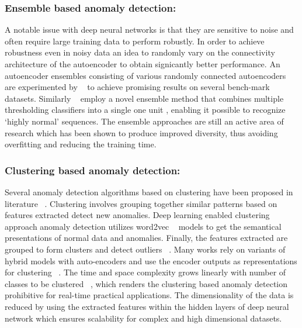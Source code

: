\subsubsection{Ensemble based anomaly detection:}
 A notable issue with deep neural networks is that they are sensitive to noise and often
require large training data to perform robustly. In order to achieve robustness even in noisy data an idea to randomly vary on the connectivity architecture of the autoencoder to obtain
signicantly better performance. An autoencoder ensembles consisting of  various randomly connected autoencoders are experimented by  ~\cite{chen2017outlier} to achieve promising results on several bench-mark datasets. Similarly ~\cite{kim2016lstm} employ a novel ensemble method that combines  multiple thresholding classifiers into a single one unit , enabling it possible to recognize ‘highly normal’ sequences. The ensemble approaches are still an active area of research which has been shown to produce improved diversity, thus avoiding overfitting and reducing the training time.

\subsubsection{Clustering based anomaly detection:}
Several anomaly detection  algorithms based on clustering have been proposed in literature ~\cite{ester1996density}. Clustering involves grouping together similar patterns based on features extracted  detect new anomalies.  Deep learning enabled clustering approach anomaly detection utilizes word2vec ~\cite{mikolov2013efficient}  models to get the semantical presentations of normal data and anomalies. Finally, the features extracted are grouped to form clusters and detect outliers ~\cite{yuan2017deep}. Many works rely on variants of hybrid models with auto-encoders and use the encoder outputs as representations for clustering ~\cite{aytekin2018clustering,xie2016unsupervised,guo2017improved,xie2016unsupervised,guo2017deep,wang2016learning,mani2018scalable}. The time and space complexity grows linearly with number of classes to be clustered ~\cite{sreekanth2010generalized}, which renders the clustering based anomaly detection prohibitive for real-time practical applications. The dimensionality of the data is reduced by using the extracted features within the hidden layers of deep neural network which ensures scalability for complex and high dimensional datasets.


